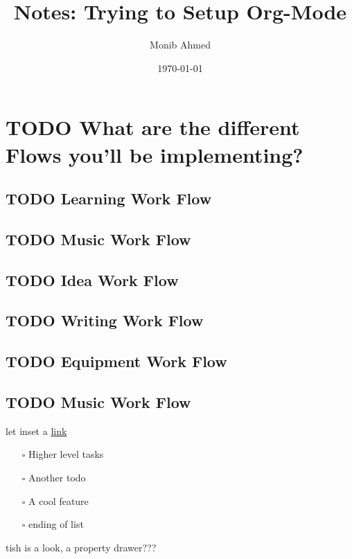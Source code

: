 \documentclass[11pt]{article}
\author{Monib Ahmed}
\date{\today}
\title{Notes: Trying to Setup Org-Mode}
\begin{document}
\maketitle
\tableofcontents

\section{{\bfseries\sffamily TODO} What are the different Flows you'll be implementing?}
\label{sec:org4c46bee}
\subsection{{\bfseries\sffamily TODO} Learning Work Flow}
\label{sec:org4c24657}
\subsection{{\bfseries\sffamily TODO} Music Work Flow}
\label{sec:org4a5283b}
\subsection{{\bfseries\sffamily TODO} Idea Work Flow}
\label{sec:org1b4e82c}
\subsection{{\bfseries\sffamily TODO} Writing Work Flow}
\label{sec:orga8b01a8}
\subsection{{\bfseries\sffamily TODO} Equipment Work Flow}
\label{sec:org034696f}
\subsection{{\bfseries\sffamily TODO} Music Work Flow}
\label{sec:orgcd95b81}
let inset a \href{www.google.com}{link}

\begin{itemize}
\item[{$\square$}] Higher level tasks
\item[{$\square$}] Another todo
\item[{$\square$}] A cool feature
\item[{$\square$}] ending of list
\end{itemize}

tish is a look, a property drawer???
\end{document}
